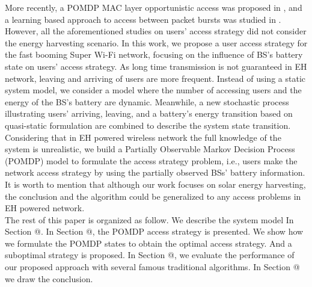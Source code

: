 \documentclass[conference]{IEEEtran}
\makeatletter
\newcommand{\Rmnum}[1]{\expandafter\@slowromancap\romannumeral #1@}
\makeatother
\begin{document}
More recently, a POMDP MAC layer opportunistic access was proposed in \cite{zhao1}, and
a learning based approach to access between packet bursts was studied in \cite{kae1}.
\\
\indent However, all the aforementioned studies on users' access strategy did not consider the energy harvesting scenario.
In this work, we propose a user access strategy for the fast booming Super Wi-Fi network,
focusing on the influence of BS's battery state on users' access strategy.
As long time transmission is not guaranteed in EH network,
leaving and arriving of users are more frequent.
Instead of using a static system model,
we consider a model where the number of accessing users and the energy of the BS's battery are dynamic.
Meanwhile, a new stochastic process illustrating users' arriving, leaving, and a battery's energy transition based on quasi-static formulation
are combined to describe the system state transition.
Considering that in EH powered wireless network the full knowledge of the system is unrealistic,
we build a Partially Observable Markov Decision Process (POMDP) model to formulate the access strategy problem, i.e., users make the network access strategy by using the partially observed BSs' battery information.
It is worth to mention that although our work focuses on solar energy harvesting,
the conclusion and the algorithm could be generalized to any access problems in EH powered network.
\\
\indent The rest of this paper is organized as follow.
We describe the system model In Section \Rmnum{2}.
In Section \Rmnum{3}, the POMDP access strategy is presented.
We show how we formulate the POMDP states to obtain the optimal access strategy.
And a suboptimal strategy is proposed.
In Section \Rmnum{4}, we evaluate the performance of our proposed approach with several famous traditional algorithms.
In Section \Rmnum{5} we draw the conclusion.
\end{document}
